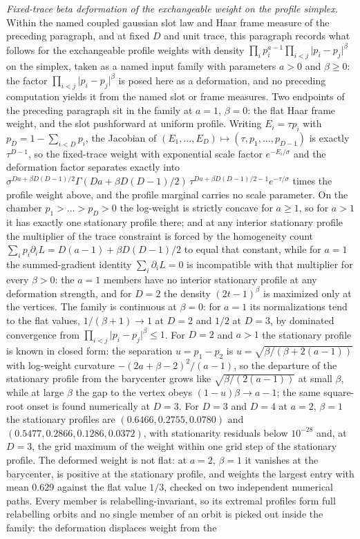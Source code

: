 \documentclass{article}
\begin{document}
\emph{Fixed-trace beta deformation of the exchangeable weight on the profile simplex.} Within the named coupled gaussian slot law and Haar frame measure of the preceding paragraph, and at fixed \(D\) and unit trace, this paragraph records what follows for the exchangeable profile weights with density \(\prod_{i}p_{i}^{a-1}\prod_{i<j}\lvert p_{i}-p_{j}\rvert^{\beta}\) on the simplex, taken as a named input family with parameters \(a>0\) and \(\beta\ge 0\): the factor \(\prod_{i<j}\lvert p_{i}-p_{j}\rvert^{\beta}\) is posed here as a deformation, and no preceding computation yields it from the named slot or frame measures. Two endpoints of the preceding paragraph sit in the family at \(a=1\), \(\beta=0\): the flat Haar frame weight, and the slot pushforward at uniform profile. Writing \(E_{i}=\tau p_{i}\) with \(p_{D}=1-\sum_{i<D}p_{i}\), the Jacobian of \((E_{1},\dots,E_{D})\mapsto(\tau,p_{1},\dots,p_{D-1})\) is exactly \(\tau^{D-1}\), so the fixed-trace weight with exponential scale factor \(e^{-E_{i}/\sigma}\) and the deformation factor separates exactly into \(\sigma^{Da+\beta D(D-1)/2}\Gamma(Da+\beta D(D-1)/2)\,\tau^{Da+\beta D(D-1)/2-1}e^{-\tau/\sigma}\) times the profile weight above, and the profile marginal carries no scale parameter. On the chamber \(p_{1}>\dots>p_{D}>0\) the log-weight is strictly concave for \(a\ge 1\), so for \(a>1\) it has exactly one stationary profile there; and at any interior stationary profile the multiplier of the trace constraint is forced by the homogeneity count \(\sum_{i}p_{i}\partial_{i}L=D(a-1)+\beta D(D-1)/2\) to equal that constant, while for \(a=1\) the summed-gradient identity \(\sum_{i}\partial_{i}L=0\) is incompatible with that multiplier for every \(\beta>0\): the \(a=1\) members have no interior stationary profile at any deformation strength, and for \(D=2\) the density \((2t-1)^{\beta}\) is maximized only at the vertices. The family is continuous at \(\beta=0\): for \(a=1\) its normalizations tend to the flat values, \(1/(\beta+1)\to 1\) at \(D=2\) and \(1/2\) at \(D=3\), by dominated convergence from \(\prod_{i<j}\lvert p_{i}-p_{j}\rvert^{\beta}\le 1\). For \(D=2\) and \(a>1\) the stationary profile is known in closed form: the separation \(u=p_{1}-p_{2}\) is \(u=\sqrt{\beta/(\beta+2(a-1))}\) with log-weight curvature \(-(2a+\beta-2)^{2}/(a-1)\), so the departure of the stationary profile from the barycenter grows like \(\sqrt{\beta/(2(a-1))}\) at small \(\beta\), while at large \(\beta\) the gap to the vertex obeys \((1-u)\beta\to a-1\); the same square-root onset is found numerically at \(D=3\). For \(D=3\) and \(D=4\) at \(a=2\), \(\beta=1\) the stationary profiles are \((0.6466,0.2755,0.0780)\) and \((0.5477,0.2866,0.1286,0.0372)\), with stationarity residuals below \(10^{-28}\) and, at \(D=3\), the grid maximum of the weight within one grid step of the stationary profile. The deformed weight is not flat: at \(a=2\), \(\beta=1\) it vanishes at the barycenter, is positive at the stationary profile, and weights the largest entry with mean \(0.629\) against the flat value \(1/3\), checked on two independent numerical paths. Every member is relabelling-invariant, so its extremal profiles form full relabelling orbits and no single member of an orbit is picked out inside the family: the deformation displaces weight from the 
\end{document}

